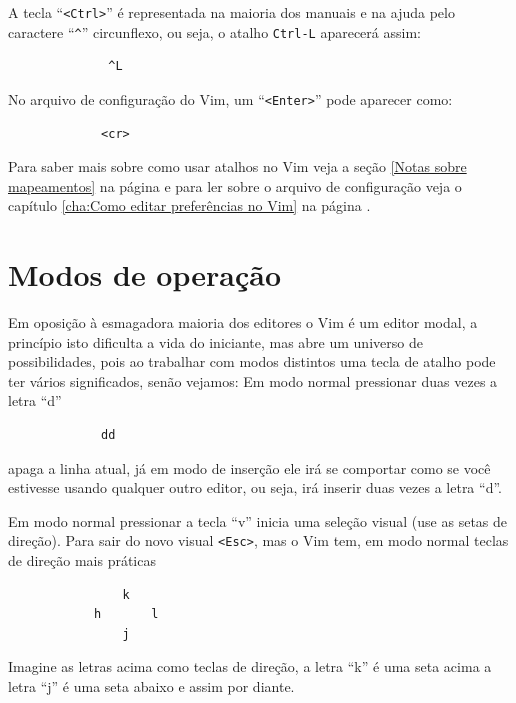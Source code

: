 \documentclass[10pt,a4paper,openany]{book}
\begin{document}
A tecla ``\verb|<Ctrl>|'' é representada na maioria dos manuais e na ajuda
pelo caractere ``\verb|^|'' circunflexo, ou seja, o atalho \verb|Ctrl-L| aparecerá assim:

\begin{verbatim}
			  ^L
\end{verbatim}

No arquivo de configuração do Vim, um ``\verb|<Enter>|'' pode aparecer como:

\begin{verbatim}
			 <cr>
\end{verbatim}

Para saber mais sobre como usar atalhos no Vim veja a seção \ref{Notas sobre
mapeamentos} na página \pageref{Notas sobre mapeamentos} e para ler sobre o
arquivo de configuração veja o capítulo \ref{cha:Como editar preferências no Vim} na página
\pageref{cha:Como editar preferências no Vim}.


\section{Modos de operação}\label{Modos de operação}

Em oposição à esmagadora maioria dos editores o Vim é um editor modal, a
princípio isto dificulta a vida do iniciante, mas abre um universo de
possibilidades, pois ao trabalhar com modos distintos uma tecla de
atalho pode ter vários significados, senão vejamos:
Em modo normal pressionar duas vezes a letra ``d''
\begin{verbatim}
			 dd
\end{verbatim}
apaga a linha atual, já em modo de inserção ele irá se comportar como se você estivesse
usando qualquer outro editor, ou seja, irá inserir duas vezes a letra ``d''.

Em modo normal pressionar a tecla ``v'' inicia uma seleção visual (use as setas de direção).
Para sair do novo visual \verb|<Esc>|, mas o Vim tem, em modo normal teclas de direção mais práticas

\begin{verbatim}
				k
			h		l
				j
\end{verbatim}

Imagine as letras acima como teclas de direção, a letra ``k'' é uma seta acima
a letra ``j'' é uma seta abaixo e assim por diante.

\end{document}
